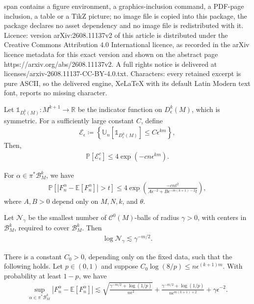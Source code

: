 \documentclass[10pt,a4paper]{amsart}
\newcommand{\E}{\mathbb{E}}
\newcommand{\PP}{\mathbb{P}}
\newcommand{\R}{\mathbb{R}}
\newcommand{\U}{\mathbb{U}}
\newcommand{\cB}{\mathcal{B}}
\newcommand{\cC}{\mathcal{C}}
\newcommand{\cE}{\mathcal{E}}
\newcommand{\cN}{\mathcal{N}}
\newcommand{\ls}{\lesssim}
\newcommand{\one}{\mathbb{1}}
\begin{document}
span contains a figure environment, a graphics-inclusion command, a PDF-page inclusion, a table or a TikZ picture; no image file is copied into this package, the package declares no asset dependency and no image file is redistributed with it. Licence: version arXiv:2608.11137v2 of this article is distributed under the Creative Commons Attribution 4.0 International licence, as recorded in the arXiv licence metadata for this exact version and shown on the abstract page https://arxiv.org/abs/2608.11137v2. A full rights notice is delivered at licenses/arxiv-2608.11137-CC-BY-4.0.txt. Characters: every retained excerpt is pure ASCII, so the delivered engine, XeLaTeX with its default Latin Modern text font, reports no missing character.
    \begin{lemma} \label{lem:concentration_D_k_support}
        Let $\one_{D^k_\epsilon(M)} : M^{k+1} \to \R$ be the indicator function on $D^k_\epsilon(M)$, which is symmetric. For a sufficiently large constant $C$, define
        \begin{align}
            \cE_\epsilon \coloneqq \left\{ \U_n[\one_{D^k_\epsilon(M)}] \leq C\epsilon^{km}\right\},
        \end{align}
        Then,
        \begin{align}
            \PP[\cE_\epsilon^c] \leq 4 \exp \left(-cn\epsilon^{km}\right).
        \end{align}
    \end{lemma}

\begin{lemma} \label{lem:codiff_pointwise_variance}
    For $\alpha\in\pi^*\cB_M^k$, we have
    \begin{align}
        \PP[|F_n^\alpha-\E[F_n^\alpha]|>t]
        \leq 4\exp\left(\frac{-cnt^2}{A\epsilon^{-2}+B\epsilon^{-m(k+1)-2}t}\right),
    \end{align}
    where $A,B>0$ depend only on $M,N,k$, and $\theta$.
\end{lemma}

\begin{lemma} \label{lem:codiff_covering_bound}
    Let $\cN_\gamma$ be the smallest number of $\cC^0(M)$-balls of radius $\gamma>0$, with centers in $\cB_M^k$, required to cover $\cB_M^k$. Then
    \begin{align}
        \log \cN_\gamma\ls \gamma^{-m/2}.
    \end{align}
\end{lemma}

\begin{proposition} \label{prop:off_diagonal_covering_variance}
    There is a constant $C_0>0$, depending only on the fixed data, such that the following holds. Let $p\in(0,1)$ and suppose $C_0\log(8/p)\leq n\epsilon^{(k+1)m}$. With probability at least $1-p$, we have
    \begin{align}
        \sup_{\alpha\in\pi^*\cB_M^k}|F_n^\alpha-\E[F_n^\alpha]|
        \ls \sqrt{\frac{\gamma^{-m/2}+\log(1/p)}{n\epsilon^2}}
        +\frac{\gamma^{-m/2}+\log(1/p)}{n\epsilon^{m(k+1)+2}}
        +\gamma\epsilon^{-2}.
    \end{align}
\end{proposition}
\end{document}
